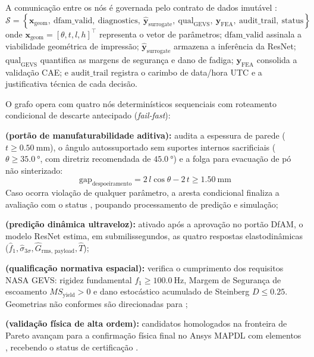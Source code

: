 A comunicação entre os nós é governada pelo contrato de dados imutável :
\begin{equation}
  \mathcal{S} = \left\{ \mathbf{x}_{\text{geom}},\ \text{dfam\_valid},\ \text{diagnostics},\ \hat{\mathbf{y}}_{\text{surrogate}},\ \text{qual}_{\text{GEVS}},\ \mathbf{y}_{\text{FEA}},\ \text{audit\_trail},\ \text{status} \right\}
  \label{eq:estado}
\end{equation}
onde $\mathbf{x}_{\text{geom}} = [\theta, t, l, h]^{\top}$ representa o vetor de parâmetros; $\text{dfam\_valid}$ assinala a viabilidade geométrica de impressão; $\hat{\mathbf{y}}_{\text{surrogate}}$ armazena a inferência da ResNet; $\text{qual}_{\text{GEVS}}$ quantifica as margens de segurança e dano de fadiga; $\mathbf{y}_{\text{FEA}}$ consolida a validação CAE; e $\text{audit\_trail}$ registra o carimbo de data/hora UTC e a justificativa técnica de cada decisão.

O grafo opera com quatro nós determinísticos sequenciais com roteamento condicional de descarte antecipado (\textit{fail-fast}):
\begin{alineas}
  \item \textbf{ (portão de manufaturabilidade aditiva):} audita a espessura de parede ($t \ge \SI{0.50}{\milli\metre}$), o ângulo autossuportado sem suportes internos sacrificiais ($\theta \ge \SI{35.0}{\degree}$, com diretriz recomendada de $\SI{45.0}{\degree}$) e a folga para evacuação de pó não sinterizado:
  \begin{equation}
    \text{gap}_{\text{despoeiramento}} = 2\, l \cos\theta - 2\, t \ge \SI{1.50}{\milli\metre}
    \label{eq:gap}
  \end{equation}
  Caso ocorra violação de qualquer parâmetro, a aresta condicional  finaliza a avaliação com o status , poupando processamento de predição e simulação;
  \item \textbf{ (predição dinâmica ultraveloz):} ativado após a aprovação no portão DfAM, o modelo ResNet estima, em submilissegundos, as quatro respostas elastodinâmicas ($\hat{f}_1, \hat{\sigma}_{3\sigma}, \hat{G}_{\text{rms, payload}}, \hat{T}$);
  \item \textbf{ (qualificação normativa espacial):} verifica o cumprimento dos requisitos NASA GEVS: rigidez fundamental $f_1 \ge \SI{100.0}{\hertz}$, Margem de Segurança de escoamento $MS_{\text{yield}} > 0$ e dano estocástico acumulado de Steinberg $D \le \num{0.25}$. Geometrias não conformes são direcionadas para ;
  \item \textbf{ (validação física de alta ordem):} candidatos homologados na fronteira de Pareto avançam para a confirmação física final no Ansys MAPDL com elementos , recebendo o status de certificação .
\end{alineas}

